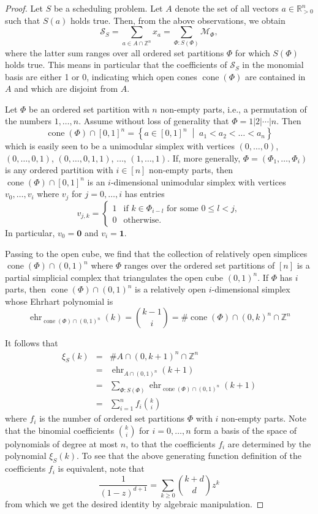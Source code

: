 \documentclass[12pt,reqno]{amsart}
\numberwithin{definition}{section}
\theoremstyle{definition}
\newcommand{\RR}{\mathbb{R}}
\newcommand{\ZZ}{\mathbb{Z}}
\newcommand{\SSS}{\mathcal{S}}
\newcommand{\ehr}{\operatorname{ehr}}
\newcommand{\cone}{\operatorname{cone}}
\newcommand{\choice}[1]{\left\{ \begin{array}{ll} #1 \end{array} \right.}
\newcommand{\mset}[2]{ \left\{ #1 \; \middle| \; #2 \right\}}
\newcommand{\ncM}{\mathcal{M}}
\begin{document}
\begin{proof}
Let $S$ be a scheduling problem. Let $A$ denote the set of all vectors $a\in\RR^n_{> 0}$ such that $S(a)$ holds true. Then, from the above observations, we obtain
\[
 \SSS_S = \sum_{a\in A\cap\ZZ^n} x_a = \sum_{\Phi:S(\Phi)} \ncM_\Phi,
\]
where the latter sum ranges over all ordered set partitions $\Phi$ for which $S(\Phi)$ holds true. This means in particular that the coefficients of $\SSS_S$ in the monomial basis are either 1 or 0, indicating which open cones $\cone(\Phi)$ are contained in $A$ and which are disjoint from $A$.

Let $\Phi$ be an ordered set partition with $n$ non-empty parts, i.e., a permutation of the numbers $1,\ldots,n$. Assume without loss of generality that $\Phi=1|2|\cdots|n$. Then
\[
  \cone(\Phi)\cap [0,1]^n = \mset{a\in[0,1]^n}{a_1<a_2<\ldots<a_n}
\]
which is easily seen to be a unimodular simplex with vertices $(0,\ldots,0)$, $(0,\ldots,0,1)$, $(0,\ldots,0,1,1)$, $\ldots$, $(1,\ldots,1)$. If, more generally, $\Phi=(\Phi_1,\ldots,\Phi_i)$ is any ordered partition with $i\in[n]$ non-empty parts, then $\cone(\Phi)\cap[0,1]^n$ is an $i$-dimensional unimodular simplex with vertices $v_0,\ldots,v_i$ where $v_j$ for $j=0,\ldots,i$ has entries 
\[
 v_{j,k} = \choice{1 & \text{if }k\in\Phi_{i-l} \text{ for some } 0\leq l < j, \\ 0 & \text{otherwise.} }
\]
In particular, $v_0= \mathbf{0}$ and $v_i=\mathbf{1}$. 

Passing to the open cube, we find that the collection of relatively open simplices $\cone(\Phi)\cap (0,1)^n$ where $\Phi$ ranges over the ordered set partitions of $[n]$ is a partial simplicial complex that triangulates the open cube $(0,1)^n$. If $\Phi$ has $i$ parts, then $\cone(\Phi)\cap (0,1)^n$ is a relatively open $i$-dimensional simplex whose Ehrhart polynomial is
\[
  \ehr_{\cone(\Phi)\cap (0,1)^n}(k) = \binom{k-1}{i} = \#\cone(\Phi)\cap (0,k)^n \cap \ZZ^n
\] 

It follows that
\begin{eqnarray*}
  \xi_S(k) &=& \#A\cap(0,k+1)^n\cap\ZZ^n \\
  &=& \ehr_{A\cap(0,1)^n}(k+1) \\
  &=& \sum_{\Phi:S(\Phi)} \ehr_{\cone(\Phi)\cap(0,1)^n}(k+1) \\
  &=& \sum_{i=1}^n f_i\binom{k}{i}
\end{eqnarray*}
where $f_i$ is the number of ordered set partitions $\Phi$ with $i$ non-empty parts. Note that the binomial coefficients $\binom{k}{i}$ for $i=0,\ldots,n$ form a basis of the space of polynomials of degree at most $n$, to that the coefficients $f_i$ are determined by the polynomial $\xi_S(k)$. To see that the above generating function definition of the coefficients $f_i$ is equivalent, note that 
\[
  \frac{1}{(1-z)^{d+1}} = \sum_{k\geq 0} \binom{k+d}{d} z^k
\]
from which we get the desired identity by algebraic manipulation.


\end{proof}
\end{document}
